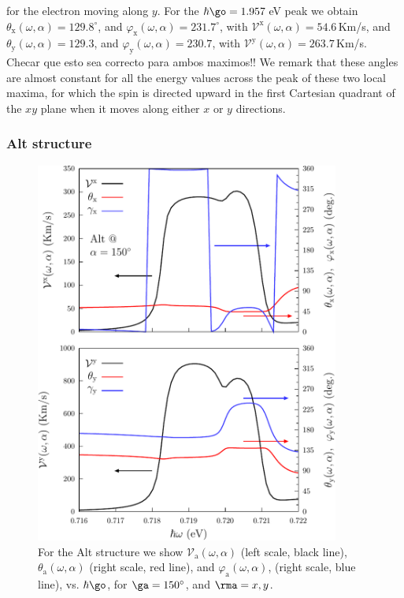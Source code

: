 \documentclass[floatfix,prb,aps,superscriptaddress,showpacs,11pt,preprint,letterpaper]{revtex4}
\def\tama{10cm}
\begin{document}
for the electron moving along $y$.
% 
For the $\hbar\go=1.957$\,eV peak we obtain 
$\theta_{\mathrm{x}} (\omega,\alpha) = 129.8^{\circ}$, and 
$\varphi_{\mathrm{x}} (\omega,\alpha) = 231.7^{\circ}$, with 
$\mathcal{V}^{\mathrm{x}} (\omega,\alpha) = 54.6$\,Km/s, and
$\theta_{\mathrm{y}}(\omega,\alpha) =129.3$, and
$\varphi_{\mathrm{y}}(\omega,\alpha) = 230.7$, with 
$\mathcal{V}^{\mathrm{y}} (\omega,\alpha) = 263.7$\,Km/s. 
Checar que esto sea correcto para ambos maximos!!
We remark that these angles are almost
constant for all the energy values across the peak of these two local maxima, for
which the spin is directed upward in the first Cartesian quadrant of the $xy$
plane when it moves along either $x$ or $y$ directions. 

\subsubsection{Alt structure}

\begin{figure}[tb]
\centering
\includegraphics[width=\tama]{altplots/alt-vx-vy-w1}
\caption{For the Alt structure we show
$\mathcal{V}_{\mathrm{a}} (\omega,\alpha)$ (left scale, black line),
$\theta_{\mathrm{a}} (\omega,\alpha)$ (right scale, red line), and
$\varphi_{\mathrm{a}} (\omega,\alpha)$, (right scale, blue line), vs.
$\hbar\go$, for $\ga=150^\circ$, and $\rma=x,y$. }
\label{fig:alt-vx-vy-w1}
\end{figure}
\end{document}
